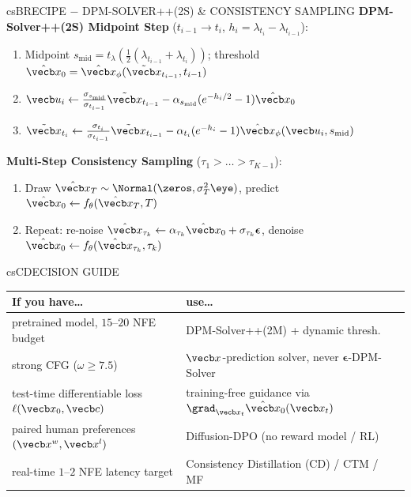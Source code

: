 \documentclass[../../../../master.tex]{subfiles}
\begin{document}
\begin{cscolumns}
\begin{cscard}{csB}{RECIPE $-$ DPM-SOLVER++(2S) \& CONSISTENCY SAMPLING}
  \textbf{DPM-Solver++(2S) Midpoint Step} ($t_{i-1}\to t_i$, $h_i=\lambda_{t_i}-\lambda_{t_{i-1}}$):
  \begin{enumerate}[leftmargin=1.2em, itemsep=1pt, topsep=1pt, parsep=0pt]
    \item Midpoint $s_{\mathrm{mid}}=t_\lambda(\frac{1}{2}(\lambda_{t_{i-1}}+\lambda_{t_i}))$; threshold $\hat{\vecb x}_0=\hat{\vecb x}_\phi(\tilde{\vecb x}_{t_{i-1}},t_{i-1})$
    \item $\vecb u_i\gets\frac{\sigma_{s_{\mathrm{mid}}}}{\sigma_{t_{i-1}}}\tilde{\vecb x}_{t_{i-1}}-\alpha_{s_{\mathrm{mid}}}(e^{-h_i/2}-1)\hat{\vecb x}_0$
    \item $\tilde{\vecb x}_{t_i}\gets\frac{\sigma_{t_i}}{\sigma_{t_{i-1}}}\tilde{\vecb x}_{t_{i-1}}-\alpha_{t_i}(e^{-h_i}-1)\hat{\vecb x}_\phi(\vecb u_i,s_{\mathrm{mid}})$
  \end{enumerate}
  \vspace{2pt}
  \textbf{Multi-Step Consistency Sampling} ($\tau_1>\dots>\tau_{K-1}$):
  \begin{enumerate}[leftmargin=1.2em, itemsep=1pt, topsep=1pt, parsep=0pt]
    \item Draw $\hat{\vecb x}_T\sim\Normal(\zeros,\sigma_T^2\eye)$, predict $\hat{\vecb x}_0\gets f_\theta(\hat{\vecb x}_T,T)$
    \item Repeat: re-noise $\hat{\vecb x}_{\tau_k}\gets\alpha_{\tau_k}\hat{\vecb x}_0+\sigma_{\tau_k}\boldsymbol\epsilon$, denoise $\hat{\vecb x}_0\gets f_\theta(\hat{\vecb x}_{\tau_k},\tau_k)$
  \end{enumerate}
\end{cscard}
\columnbreak

\begin{cscard}{csC}{DECISION GUIDE}
  \renewcommand{\arraystretch}{1.22}\small
  \begin{tabular}{@{}>{\raggedright\arraybackslash}p{3.1cm}>{\raggedright\arraybackslash}p{4.6cm}@{}}
    \textbf{If you have\ldots} & \textbf{use\ldots}\\ \hline
    pretrained model, $15$--$20$ NFE budget & DPM-Solver++(2M) + dynamic thresh.\\
    strong CFG ($\omega\ge 7.5$) & $\vecb x$-prediction solver, never $\boldsymbol\epsilon$-DPM-Solver\\
    test-time differentiable loss $\ell(\vecb x_0,\vecb c)$ & training-free guidance via $\grad_{\vecb x_t}\hat{\vecb x}_0(\vecb x_t)$\\
    paired human preferences $(\vecb x^w,\vecb x^l)$ & Diffusion-DPO (no reward model / RL)\\
    real-time $1$--$2$ NFE latency target & Consistency Distillation (CD) / CTM / MF\\
  \end{tabular}
\end{cscard}


\end{cscolumns}
\end{document}
